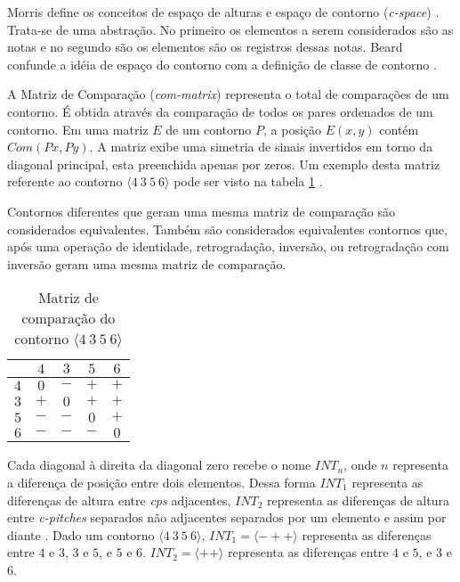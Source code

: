 \documentclass[12pt,brazil]{book}
\newcommand{\eng}[1]{\textit{#1}}
\begin{document}
Morris define os conceitos de espaço de alturas e espaço de contorno
(\eng{\gls{c-space}}) \cite{morris87:composition}. Trata-se de uma
abstração. No primeiro os elementos a serem considerados são as notas
e no segundo são os elementos são os registros dessas notas. Beard
confunde a idéia de espaço do contorno com a definição de classe de
contorno \cite[p. 11]{beard03:contour}.

A Matriz de Comparação (\eng{\gls{com-matrix}}) representa o total de
comparações de um contorno. É obtida através da comparação de todos os
pares ordenados de um contorno. Em uma matriz $E$ de um contorno $P$,
a posição $E (x,y)$ contém $Com (Px,Py)$. A matriz exibe uma simetria
de sinais invertidos em torno da diagonal principal, esta preenchida
apenas por zeros. Um exemplo desta matriz referente ao contorno
$\langle 4\:3\:5\:6 \rangle$ pode ser visto na tabela
\ref{tab:matriz-4356} \cite[p. 28]{morris87:composition}.

Contornos diferentes que geram uma mesma matriz de comparação
são considerados equivalentes. Também são considerados equivalentes
contornos que, após uma operação de identidade, retrogradação,
inversão, ou retrogradação com inversão geram uma mesma matriz de
comparação.

\begin{table}
  \centering
  \begin{tabular}{r|cccc}
    & $4$ & $3$ & $5$ & $6$ \\
    \hline
    $4$ & $0$ & $-$ & $+$ & $+$ \\
    $3$ & $+$ & $0$ & $+$ & $+$ \\
    $5$ & $-$ & $-$ & $0$ & $+$ \\
    $6$ & $-$ & $-$ & $-$ & $0$ \\
  \end{tabular}
  \caption{Matriz de comparação do contorno $\langle 4\:3\:5\:6 \rangle$}
\label{tab:matriz-4356}
\end{table}

Cada diagonal à direita da diagonal zero recebe o nome $INT_n$, onde
$n$ representa a diferença de posição entre dois elementos. Dessa
forma $INT_1$ representa as diferenças de altura entre \eng{\gls{cps}}
adjacentes, $INT_2$ representa as diferenças de altura entre
\eng{c-pitches} separados não adjacentes separados por um elemento e
assim por diante \cite[p. 231]{marvin.ea87:relating}. Dado um contorno
$\langle 4\:3\:5\:6 \rangle$, $INT_1 = \langle - + +\rangle$
representa as diferenças entre $4$ e $3$, $3$ e $5$, e $5$ e
$6$. $INT_2 = \langle + + \rangle$ representa as diferenças entre $4$
e $5$, e $3$ e $6$.
\end{document}
